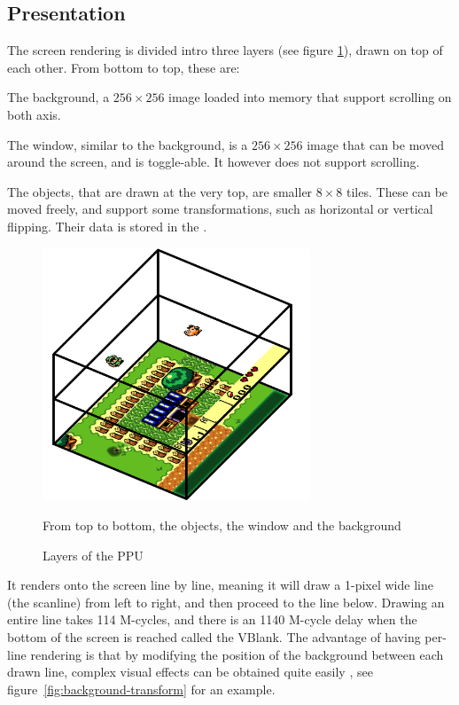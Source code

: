 \documentclass[11pt]{informatics-report}
\begin{document}
\subsection{Presentation}

The screen rendering is divided intro three layers (see figure \ref{fig:ppu-layers}), drawn on top of each other. From bottom to top, these are:

\begin{compactitem}
	\item The background, a $256 \times 256$ image loaded into memory that support scrolling on both axis.
	\item The window, similar to the background, is a $256 \times 256$ image that can be moved around the screen, and is toggle-able. It however does not support scrolling.
	\item The objects, that are drawn at the very top, are smaller $8 \times 8$ tiles. These can be moved freely, and support some transformations, such as horizontal or vertical flipping. Their data is stored in the .
\end{compactitem}

\begin{figure}[h]
    \centering
    \includegraphics[width=8cm]{images/ppu-layers}\\
    \caption{Layers of the PPU}
    From top to bottom, the objects, the window and the background
    \label{fig:ppu-layers}
\end{figure}

It renders onto the screen line by line, meaning it will draw a 1-pixel wide line (the scanline) from left to right, and then proceed to the line below. Drawing an entire line takes 114 M-cycles, and there is an 1140 M-cycle delay when the bottom of the screen is reached called the VBlank. The advantage of having per-line rendering is that by modifying the position of the background between each drawn line, complex visual effects can be obtained quite easily \cite{gameboy_talk}, see figure~\ref{fig:background-transform} for an example.
\end{document}
